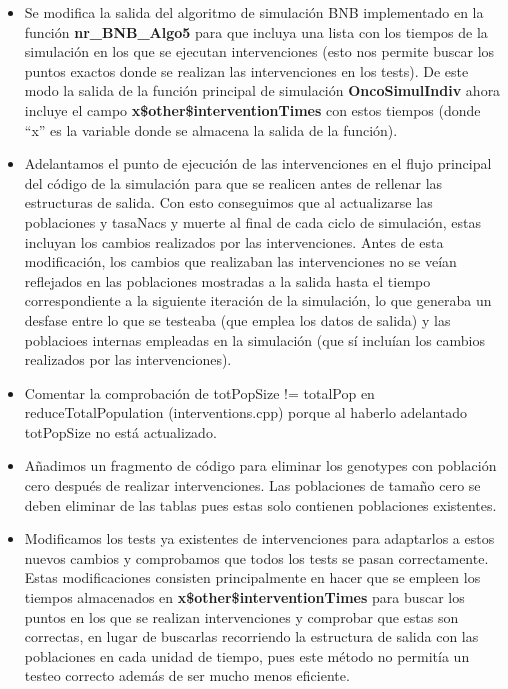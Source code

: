 \begin{itemize}
		\item Se modifica la salida del algoritmo de simulación BNB implementado en la función \textbf{nr\_BNB\_Algo5} para que incluya una lista con los tiempos de la simulación en los que se ejecutan intervenciones (esto nos permite buscar los puntos exactos donde se realizan las intervenciones en los tests). De este modo la salida de la función principal de simulación \textbf{OncoSimulIndiv} ahora incluye el campo \textbf{x\$other\$interventionTimes} con estos tiempos (donde ``x'' es la variable donde se almacena la salida de la función).
		\item Adelantamos el punto de ejecución de las intervenciones en el flujo principal del código de la simulación para que se realicen antes de rellenar las estructuras de salida. Con esto conseguimos que al actualizarse las poblaciones y \glspl{tasaNac} y muerte al final de cada ciclo de simulación, estas incluyan los cambios realizados por las intervenciones. Antes de esta modificación, los cambios que realizaban las intervenciones no se veían reflejados en las poblaciones mostradas a la salida hasta el tiempo correspondiente a la siguiente iteración de la simulación, lo que generaba un desfase entre lo que se testeaba (que emplea los datos de salida) y las poblacioes internas empleadas en la simulación (que sí incluían los cambios realizados por las intervenciones).
		\item Comentar la comprobación de totPopSize != totalPop en reduceTotalPopulation (interventions.cpp) porque al haberlo adelantado totPopSize no está actualizado.
		\item Añadimos un fragmento de código para eliminar los \glspl{genotype} con población cero después de realizar intervenciones. Las poblaciones de tamaño cero se deben eliminar de las tablas pues estas solo contienen poblaciones existentes. 
		\item Modificamos los tests ya existentes de intervenciones para adaptarlos a estos nuevos cambios y comprobamos que todos los tests se pasan correctamente. Estas modificaciones consisten principalmente en hacer que se empleen los tiempos almacenados en \textbf{x\$other\$interventionTimes} para buscar los puntos en los que se realizan intervenciones y comprobar que estas son correctas, en lugar de buscarlas recorriendo la estructura de salida con las poblaciones en cada unidad de tiempo, pues este método no permitía un testeo correcto además de ser mucho menos eficiente.
\end{itemize}

